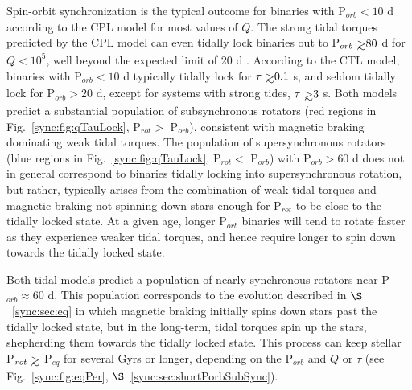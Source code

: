 Spin-orbit synchronization is the typical outcome for binaries with P$_{orb} < 10$ d according to the CPL model for most values of $Q$. The strong tidal torques predicted by the CPL model can even tidally lock binaries out to P$_{orb} \gsim 80 $ d for $Q < 10^5$, well beyond the expected limit of 20 d \citep{Meibom2006}.  According to the CTL model, binaries with P$_{orb} < 10$ d typically tidally lock for $\tau \gsim 0.1$ s, and seldom tidally lock for P$_{orb} > 20$ d, except for systems with strong tides, $\tau \gsim 3$ s.  Both models predict a substantial population of subsynchronous rotators (red regions in Fig.~\ref{sync:fig:qTauLock}, P$_{rot} >$ P$_{orb}$), consistent with magnetic braking dominating weak tidal torques.  The population of supersynchronous rotators (blue regions in Fig.~\ref{sync:fig:qTauLock}, P$_{rot} <$ P$_{orb}$) with P$_{orb} > 60$ d does not in general correspond to binaries tidally locking into supersynchronous rotation, but rather, typically arises from the combination of weak tidal torques and magnetic braking not spinning down stars enough for P$_{rot}$ to be close to the tidally locked state. At a given age, longer P$_{orb}$ binaries will tend to rotate faster as they experience weaker tidal torques, and hence require longer to spin down towards the tidally locked state.

Both tidal models predict a population of nearly synchronous rotators near P$_{orb} \approx 60$ d.  This population corresponds to the evolution described in $\S$~\ref{sync:sec:eq} in which magnetic braking initially spins down stars past the tidally locked state, but in the long-term, tidal torques spin up the stars, shepherding them towards the tidally locked state.  This process can keep stellar P$_{rot} \gsim$ P$_{eq}$ for several Gyrs or longer, depending on the P$_{orb}$ and $Q$ or $\tau$ (see Fig.~\ref{sync:fig:eqPer}, $\S$~\ref{sync:sec:shortPorbSubSync}). 

